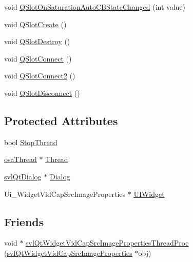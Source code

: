 \begin{DoxyCompactItemize}
\item 
void \hyperlink{classsvl_qt_widget_vid_cap_src_image_properties_a98d23a09a0f3accd01225ed6f6a89bab}{Q\-Slot\-On\-Saturation\-Auto\-C\-B\-State\-Changed} (int value)
\item 
void \hyperlink{classsvl_qt_widget_vid_cap_src_image_properties_a93807219dc4171e0dab366c3c4cac869}{Q\-Slot\-Create} ()
\item 
void \hyperlink{classsvl_qt_widget_vid_cap_src_image_properties_a97bf6b9eee12b33594fc951c602a6fdc}{Q\-Slot\-Destroy} ()
\item 
void \hyperlink{classsvl_qt_widget_vid_cap_src_image_properties_add7f0531c4e01579a59a2be2e10b5811}{Q\-Slot\-Connect} ()
\item 
void \hyperlink{classsvl_qt_widget_vid_cap_src_image_properties_a478f8c31aad5eac231c8652dffbffa07}{Q\-Slot\-Connect2} ()
\item 
void \hyperlink{classsvl_qt_widget_vid_cap_src_image_properties_aceb067bf447e29eafd7df69a0889f523}{Q\-Slot\-Disconnect} ()
\end{DoxyCompactItemize}
\subsection*{Protected Attributes}
\begin{DoxyCompactItemize}
\item 
bool \hyperlink{classsvl_qt_widget_vid_cap_src_image_properties_aded19bf213eaf8d3c8d6621d98ee85d8}{Stop\-Thread}
\item 
\hyperlink{classosa_thread}{osa\-Thread} $\ast$ \hyperlink{classsvl_qt_widget_vid_cap_src_image_properties_ab9dc088e704551eca6d2ba3a9888f968}{Thread}
\item 
\hyperlink{classsvl_qt_dialog}{svl\-Qt\-Dialog} $\ast$ \hyperlink{classsvl_qt_widget_vid_cap_src_image_properties_ac4580e7f0283c64369cb50428966b12d}{Dialog}
\item 
Ui\-\_\-\-Widget\-Vid\-Cap\-Src\-Image\-Properties $\ast$ \hyperlink{classsvl_qt_widget_vid_cap_src_image_properties_ac38817abd20ff403980a47cf9c237b48}{U\-I\-Widget}
\end{DoxyCompactItemize}
\subsection*{Friends}
\begin{DoxyCompactItemize}
\item 
void $\ast$ \hyperlink{classsvl_qt_widget_vid_cap_src_image_properties_a4ae0501bac6e06e5ffa41e416d45c773}{svl\-Qt\-Widget\-Vid\-Cap\-Src\-Image\-Properties\-Thread\-Proc} (\hyperlink{classsvl_qt_widget_vid_cap_src_image_properties}{svl\-Qt\-Widget\-Vid\-Cap\-Src\-Image\-Properties} $\ast$obj)
\end{DoxyCompactItemize}
